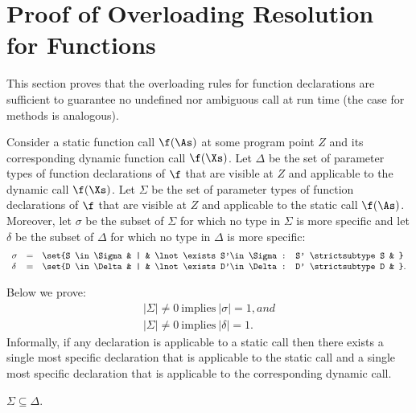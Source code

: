 %
%
%
%

\section{Proof of Overloading Resolution for Functions}

This section proves that the overloading rules for
function declarations are sufficient to guarantee no undefined nor
ambiguous call at run time (the case for methods is analogous).

Consider a static function call $\f(\As)$ at some program point $Z$
and its corresponding dynamic function call $\f(\Xs)$.  Let $\Delta$
be the set of parameter types of function declarations of $\f$ that
are visible at $Z$ and applicable to the dynamic call $\f(\Xs)$.  Let
$\Sigma$ be the set of parameter types of function declarations of
$\f$ that are visible at $Z$ and applicable to the static call
$\f(\As)$.  Moreover, let $\sigma$ be the subset of $\Sigma$ for which
no type in $\Sigma$ is more specific and let $\delta$ be the
subset of $\Delta$ for which no type in $\Delta$ is more
specific:
\[
\begin{array}{lclcll}
\sigma & = & \set{S \in \Sigma & | & \lnot \exists S'\in\Sigma: S' \strictsubtype S & }
\\
\delta & = & \set{D \in \Delta & | & \lnot \exists D'\in\Delta: D' \strictsubtype D & }.
\end{array}
\]

Below we prove:
\[
\begin{array}{l}
|\Sigma| \neq 0 \ \text{implies} \ |\sigma| = 1, and
\\
|\Sigma| \neq 0 \ \text{implies} \ |\delta| = 1.
\end{array}
\]
Informally, if any declaration is applicable to a static call then there
exists a single most specific declaration that is applicable to the
static call and a single most specific declaration that is applicable
to the corresponding dynamic call.
\\
\begin{lemma}
\label{lem:subset}
$\Sigma \subseteq \Delta$.
\end{lemma}

